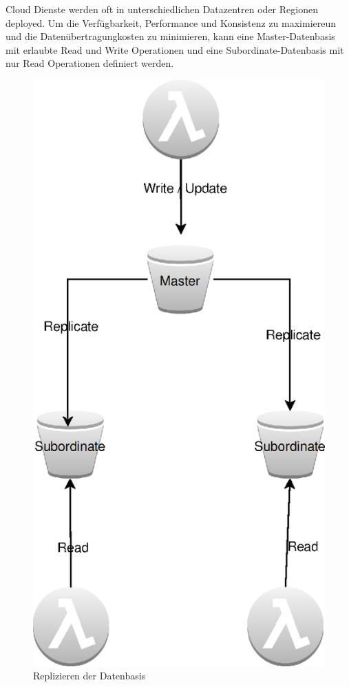 \documentclass[
12pt,
english,
ngerman,
headsepline,
twoside,
openright,
numbers=noenddot,version=first
]{scrreprt}
\begin{document}
Cloud Dienste werden oft in unterschiedlichen Datazentren oder Regionen deployed. Um die Verfügbarkeit, Performance und Konsistenz zu maximiereun und die Datenübertragungkosten zu minimieren, kann eine Master-Datenbasis mit erlaubte Read und Write Operationen und eine Subordinate-Datenbasis mit nur Read Operationen definiert werden. 
\begin{figure}[H]
	\begin{center}
		\includegraphics[scale=0.60]{./pics/aws/pattern-master-subordinate-data-replication.eps}
		\caption{Replizieren der Datenbasis}
		\label{pic:master-slave}
	\end{center}
\end{figure}
\end{document}
